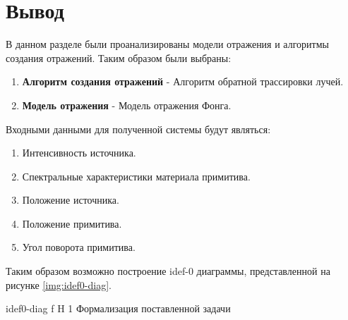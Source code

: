 \section*{Вывод}
В данном разделе были проанализированы модели отражения и алгоритмы создания отражений.
Таким образом были выбраны:
\begin{enumerate}
	\item \textbf{Алгоритм создания отражений} - Алгоритм обратной трассировки лучей.
	\item \textbf{Модель отражения} - Модель отражения Фонга.
\end{enumerate}


Входными данными для полученной системы будут являться:
\begin{enumerate}
	\item Интенсивность источника.
	\item Спектральные характеристики материала примитива.
	\item Положение источника.
	\item Положение примитива.
	\item Угол поворота примитива.
\end{enumerate}

Таким образом возможно построение idef-0 диаграммы, представленной на рисунке \ref{img:idef0-diag}.

{idef0-diag} %
{f} %
{H} %
{1\textwidth} %
{Формализация поставленной задачи} %

